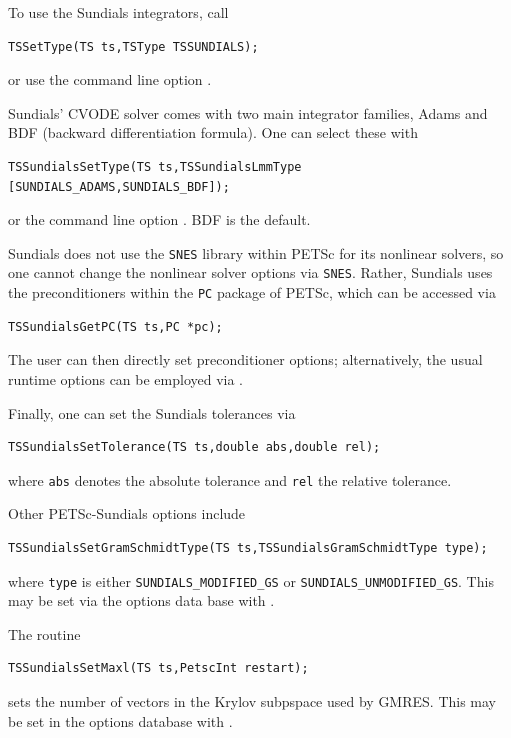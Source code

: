 To use the Sundials integrators, call
\begin{lstlisting}
TSSetType(TS ts,TSType TSSUNDIALS);
\end{lstlisting}
or use the command line option  .
  

Sundials' CVODE solver comes with two main integrator families, Adams
and BDF (backward differentiation formula). One can select these with
\begin{lstlisting}
TSSundialsSetType(TS ts,TSSundialsLmmType [SUNDIALS_ADAMS,SUNDIALS_BDF]);
\end{lstlisting}
or the command line option . BDF is
the default. 
 

Sundials does not use the \lstinline{SNES} library within PETSc for its nonlinear
solvers, so one cannot change the nonlinear solver options via
\lstinline{SNES}. Rather, Sundials uses the preconditioners within the \lstinline{PC} package
of PETSc, which can be accessed via
\begin{lstlisting}
TSSundialsGetPC(TS ts,PC *pc);
\end{lstlisting}
The user can then directly set preconditioner options;
alternatively, the usual runtime options can be employed
via .

Finally, one can set the Sundials tolerances via
\begin{lstlisting}
TSSundialsSetTolerance(TS ts,double abs,double rel);
\end{lstlisting}
where \lstinline{abs} denotes the absolute tolerance and \lstinline{rel}
the relative tolerance.

Other PETSc-Sundials options include
\begin{lstlisting}
TSSundialsSetGramSchmidtType(TS ts,TSSundialsGramSchmidtType type);
\end{lstlisting}
where \lstinline{type} is either \lstinline{SUNDIALS_MODIFIED_GS} or
\lstinline{SUNDIALS_UNMODIFIED_GS}.
 This may be set via the options data base
with .

The routine
\begin{lstlisting}
TSSundialsSetMaxl(TS ts,PetscInt restart);
\end{lstlisting}
sets the number of vectors in the Krylov subpspace used by GMRES.
This may be set in the options
database with  . 


